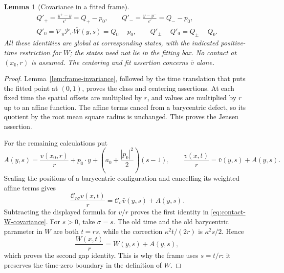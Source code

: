 \documentclass[11pt]{article}
\numberwithin{equation}{section}
\newtheorem{lemma}[theorem]{Lemma}
\theoremstyle{definition}
\theoremstyle{remark}
\newcommand{\Penv}{\mathcal{P}}
\newcommand{\Cenv}{\mathcal{C}}
\begin{document}
\begin{lemma}[Covariance in a fitted frame]
\begin{equation}\label{eq:contact-velocity-covariance}
\begin{gathered}
  Q'_+=\frac{y^+-y}{\epsilon'}=Q_+-p_0,\qquad
  Q'_- =\frac{y-y^-}{\epsilon'}=Q_--p_0,\\
  Q'_0=\nabla_y\Penv_{\epsilon'}\bar W(y,s)=Q_0-p_0,\qquad
  Q'_\pm-Q'_0=Q_\pm-Q_0.
\end{gathered}
\end{equation}
All these identities are global at corresponding states, with the indicated
positive-time restriction for $W$; the states need not lie in the fitting
box.  No contact at $(x_0,r)$ is assumed.  The centering and fit assertion
concerns $\bar v$ alone.
\end{lemma}

\begin{proof}
Lemma~\ref{lem:frame-invariance}, followed by the time translation that puts
the fitted point at $(0,1)$, proves the class and centering assertions.  At
each fixed time the spatial offsets are multiplied by $r$, and values are
multiplied by $r$ up to an affine function.  The affine terms cancel from a
barycentric defect, so its quotient by the root mean square radius is
unchanged.  This proves the Jensen assertion.

For the remaining calculations put
\[
  A(y,s)=\frac{v(x_0,r)}{r}+p_0\cdot y
             +\left(a_0+\frac{|p_0|^2}{2}\right)(s-1),
  \qquad \frac{v(x,t)}{r}=\bar v(y,s)+A(y,s).
\]
Scaling the positions of a barycentric configuration and cancelling its
weighted affine terms gives
\[
  \frac{\Cenv_{r\sigma}v(x,t)}{r}
       =\Cenv_\sigma\bar v(y,s)+A(y,s).
\]
Subtracting the displayed formula for $v/r$ proves the first identity in
\eqref{eq:contact-W-covariance}.  For $s>0$, take $\sigma=s$.  The old time
and the old barycentric parameter in $W$ are both $t=rs$, while the
correction $\kappa^2t/(2r)$ is $\kappa^2s/2$.  Hence
\[
  \frac{W(x,t)}{r}=\bar W(y,s)+A(y,s),
\]
which proves the second gap identity.  This is why the frame uses $s=t/r$:
it preserves the time-zero boundary in the definition of $W$.


\end{proof}
\end{document}
